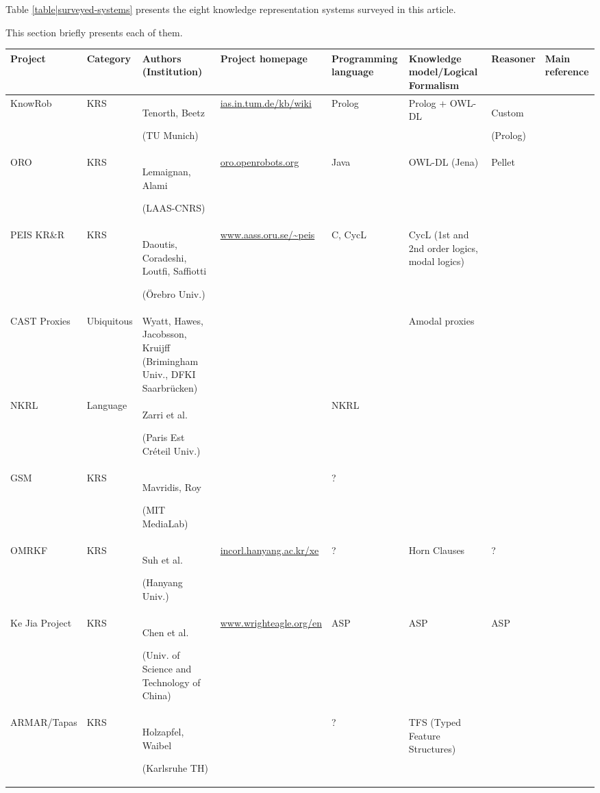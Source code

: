 \documentclass[a4paper, twocolumn]{article}
\begin{document}
Table \ref{table|surveyed-systems} presents the eight knowledge representation
systems surveyed in this article.

This section briefly presents each of them.

\begin{landscape}
\begin{table}\footnotesize
\begin{center}

\begin{tabular}{p{2.2cm}p{1.6cm}p{4cm}lp{2.4cm}p{3.4cm}p{2.8cm}p{1.5cm}}
\toprule
{\bf Project} & {\bf Category} & {\bf Authors (Institution)} & {\bf Project homepage} & {\bf Programming language} & {\bf Knowledge model/Logical Formalism} & {\bf Reasoner} & Main reference \\
\midrule
{\sc KnowRob} & KRS & Tenorth, Beetz \par (TU Munich) & \url{ias.in.tum.de/kb/wiki} & {\sc Prolog} & {\sc Prolog} + OWL-DL & Custom \par ({\sc Prolog}) & \cite{Tenorth2009a} \\
ORO & KRS & Lemaignan, Alami \par (LAAS-CNRS) & \url{oro.openrobots.org} & {\sc Java} & OWL-DL ({\sc Jena}) & {\sc Pellet} & \cite{Lemaignan2010} \\
PEIS KR\&R & KRS & Daoutis, Coradeshi, Loutfi, Saffiotti \par (Örebro Univ.) & \url{www.aass.oru.se/~peis} & {\sc C}, {\sc CycL} & CycL (1st and 2nd order logics, modal logics) & & \cite{Daoutis2009} \\
CAST Proxies & Ubiquitous & Wyatt, Hawes, Jacobsson, Kruijff (Brimingham Univ., DFKI Saarbrücken) & & & Amodal proxies & & \cite{Jacobsson2008} \\
NKRL & Language & Zarri et al. \par (Paris Est Créteil Univ.) & & NKRL & & & \cite{Sabri2011} \\
GSM & KRS & Mavridis, Roy \par (MIT MediaLab) & & ? & & & \cite{Mavridis2006} \\
OMRKF & KRS & Suh et al. \par (Hanyang Univ.) & \url{incorl.hanyang.ac.kr/xe} & ? & Horn Clauses & ? & \cite{Suh2007} \\
Ke Jia Project & KRS & Chen et al. \par (Univ. of Science and Technology of China) & \url{www.wrighteagle.org/en} & ASP & ASP & ASP & \cite{Chen2010} \\
ARMAR/Tapas & KRS & Holzapfel, Waibel \par (Karlsruhe TH) & & ? & TFS (Typed Feature Structures) & & \cite{Holzapfel2008}\\

\end{tabular}
\end{center}
\end{table}
\end{landscape}
\end{document}
